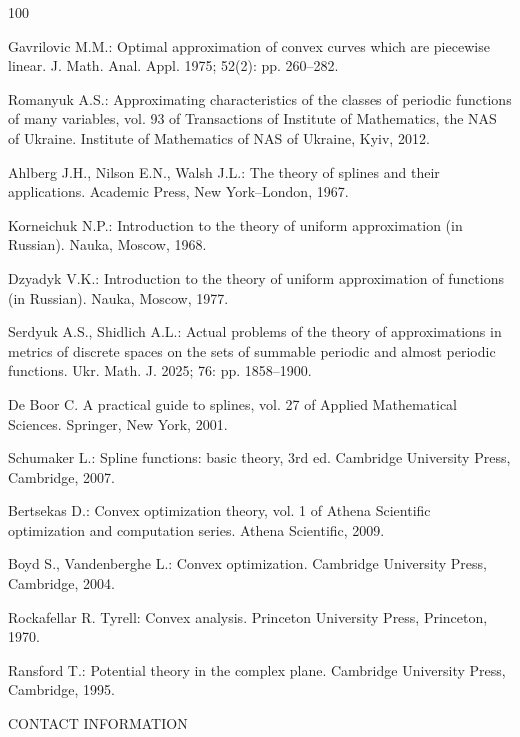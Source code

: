 \documentclass[amstex,16pt, amssymb]{article}
\theoremstyle{plain}
\theoremstyle{definition}
\numberwithin{equation}{section}
\numberwithin{equation}{section}
\begin{document}
\begin{thebibliography}{100}

 {Gavrilovic M.M.}: Optimal approximation of convex curves which are piecewise linear. J. Math. Anal. Appl. 1975; 52(2): pp. 260--282.

 {Romanyuk A.S.}: Approximating characteristics of the classes of periodic functions of many variables, vol. 93 of Transactions of Institute of Mathematics, the NAS of Ukraine. Institute of Mathematics of NAS of Ukraine, Kyiv, 2012.

 {Ahlberg J.H.,  Nilson E.N.,  Walsh J.L.}:
The theory of splines and their applica\-tions.
Academic Press, New York--London, 1967.

 {Korneichuk N.P.}: Introduction to the theory of uniform approximation (in Ru\-ssian). Nauka, Moscow, 1968.

 {Dzyadyk V.K.}: Introduction to the theory of uniform approximation of functions (in Russian). Nauka, Moscow, 1977.

 {Serdyuk A.S., Shidlich A.L.}: Actual problems of the theory of approximations in metrics of discrete spaces on the sets of summable periodic and almost periodic functions. Ukr. Math. J. 2025; 76: pp. 1858--1900.

 {De Boor C.} A practical guide to splines, vol. 27 of Applied Mathematical Sciences. Springer, New York, 2001.

 {Schumaker L.}: Spline functions: basic theory, 3rd ed. Cambridge University Press, Cambridge, 2007.

 {Bertsekas D.}: Convex optimization theory, vol. 1 of Athena Scientific optimization and computation series. Athena Scientific, 2009.

 {Boyd S., Vandenberghe L.}: Convex optimization. Cambridge University Press, Cambridge, 2004. 

 {Rockafellar R. Tyrell}: Convex analysis. Princeton University Press, Princeton, 1970.

 {Ransford T.}: Potential theory in the complex plane. Cambridge University Press, Cambridge, 1995.

\end{thebibliography}

\bigskip


CONTACT INFORMATION

\medskip
\end{document}
